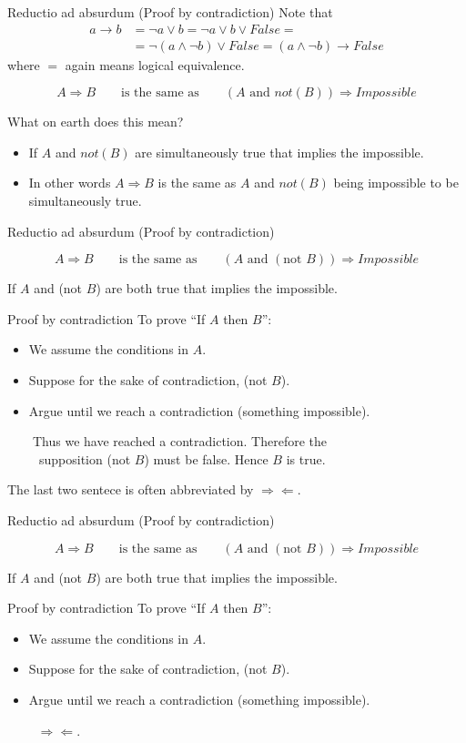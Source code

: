 \documentclass{beamer}
\def\bl[#1]#2{\begin{block}{#1}#2\end{block}}
\def\itemb{\begin{itemize}}
\def\iteme{\end{itemize}}
\begin{document}
\begin{frame}{Reductio ad absurdum (Proof by contradiction)}
Note that
\begin{align*}
a\rightarrow b&=\neg a \vee b=\neg a\vee b\vee False=\\
&=\neg(a\wedge\neg b)\vee False=(a\wedge\neg b)\rightarrow False
\end{align*}
where $=$ again means logical equivalence.
\bl[]{\vspace{-0.5cm}
\[
A\Rightarrow B\qquad\textrm{is the same as}\qquad(A\textrm{ and } not(B))\Rightarrow Impossible
\]}

  What on earth does this mean?
  \itemb
  \item If $A$ and $not(B)$ are simultaneously true that implies the impossible.
  \item In other words $A\Rightarrow B$ is the same as $A$ and $not(B)$ being impossible to be simultaneously true.
  \iteme
\end{frame}

\begin{frame}{Reductio ad absurdum (Proof by contradiction)}
\bl[]{\vspace{-0.5cm}
\[
A\Rightarrow B\qquad\textrm{is the same as}\qquad(A\textrm{ and } (\textrm{not }B))\Rightarrow Impossible
\]}
 If $A$ and (not $B$) are both true that implies the impossible.

  
\bl[Proof by contradiction]{
 To prove ``If $A$ then $B$'': \\
 \itemb
 \item We assume the conditions in $A$.\\
 \item Suppose for the sake of contradiction, (not $B$).\\
\item  Argue until we reach a contradiction (something impossible).\\ 
 \iteme
 ~~~~Thus we have reached a contradiction. Therefore the \\
 ~~~~~supposition (not $B$) must be false. Hence $B$ is true.
}
The last two sentece is often abbreviated by $\Rightarrow\Leftarrow$.
\end{frame}

\begin{frame}{Reductio ad absurdum (Proof by contradiction)}
\bl[]{\vspace{-0.5cm}
\[
A\Rightarrow B\qquad\textrm{is the same as}\qquad(A\textrm{ and } (\textrm{not }B))\Rightarrow Impossible
\]}

If $A$ and (not $B$) are both true that implies the impossible.

\bl[Proof by contradiction]{
 To prove ``If $A$ then $B$'': \\
 \itemb
\item We assume the conditions in $A$.
\item Suppose for the sake of contradiction, (not $B$).
\item Argue until we reach a contradiction (something impossible).
\iteme
~~~~ $\Rightarrow\Leftarrow$.
}
\end{frame}
\end{document}
